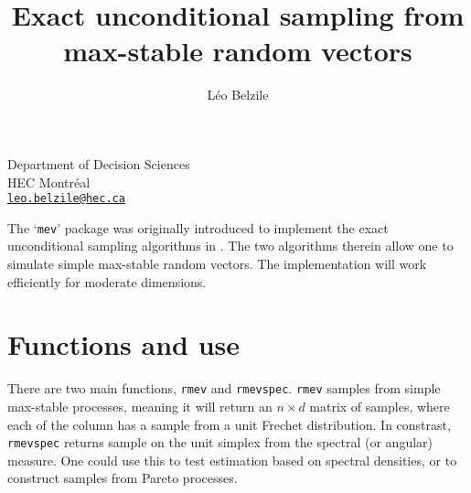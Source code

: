 \documentclass{article}\usepackage[]{graphicx}\usepackage[]{xcolor}
\newcommand{\code}[1]{\texttt{#1}}
\begin{document}

\title{Exact unconditional sampling from max-stable random vectors}
\author{Léo Belzile}
\date{}
\maketitle
\begin{center}
{ \small
Department of Decision Sciences \\ HEC Montréal  \\\href{leo.belzile@hec.ca}{\texttt{leo.belzile@hec.ca}}
}
\end{center}

The `\code{mev}' package was originally introduced to implement the exact unconditional sampling algorithms in \cite{Dombry:2016}. The two algorithms therein allow one to simulate simple max-stable random vectors. The implementation will work efficiently for moderate dimensions.

\section{Functions and use}

There are two main functions, \code{rmev} and \code{rmevspec}. \code{rmev} samples from simple max-stable processes, meaning it will return an $n \times d$ matrix of samples, where each of the column has a sample from a unit Frechet distribution. In constrast, \code{rmevspec} returns sample on the unit simplex from the spectral (or angular) measure. One could use this to test estimation based on spectral densities, or to construct samples from Pareto processes.
\end{document}
